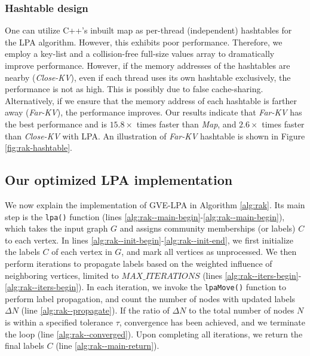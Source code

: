 \subsubsection{Hashtable design}

One can utilize C++'s inbuilt map as per-thread (independent) hashtables for the LPA algorithm. However, this exhibits poor performance. Therefore, we employ a key-list and a collision-free full-size values array to dramatically improve performance. However, if the memory addresses of the hashtables are nearby (\textit{Close-KV}), even if each thread uses its own hashtable exclusively, the performance is not as high. This is possibly due to false cache-sharing. Alternatively, if we ensure that the memory address of each hashtable is farther away (\textit{Far-KV}), the performance improves. Our results indicate that \textit{Far-KV} has the best performance and is $15.8\times$ times faster than \textit{Map}, and $2.6\times$ times faster than \textit{Close-KV} with LPA. An illustration of \textit{Far-KV} hashtable is shown in Figure \ref{fig:rak-hashtable}.







\subsection{Our optimized LPA implementation}

We now explain the implementation of GVE-LPA in Algorithm \ref{alg:rak}. Its main step is the \texttt{lpa()} function (lines \ref{alg:rak--main-begin}-\ref{alg:rak--main-begin}), which takes the input graph $G$ and assigns community memberships (or labels) $C$ to each vertex. In lines \ref{alg:rak--init-begin}-\ref{alg:rak--init-end}, we first initialize the labels $C$ of each vertex in $G$, and mark all vertices as unprocessed. We then perform iterations to propagate labels based on the weighted influence of neighboring vertices, limited to $MAX\_ITERATIONS$ (lines \ref{alg:rak--iters-begin}-\ref{alg:rak--iters-begin}). In each iteration, we invoke the \texttt{lpaMove()} function to perform label propagation, and count the number of nodes with updated labels $\Delta N$ (line \ref{alg:rak--propagate}). If the ratio of $\Delta N$ to the total number of nodes $N$ is within a specified tolerance $\tau$, convergence has been achieved, and we terminate the loop (line \ref{alg:rak--converged}). Upon completing all iterations, we return the final labels $C$ (line \ref{alg:rak--main-return}).

